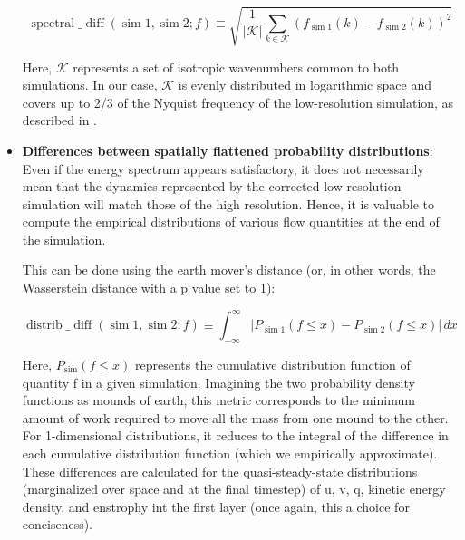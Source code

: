 \begin{itemize}
\begin{equation}
\operatorname{spectral}\_\operatorname{diff}(\operatorname{sim} 1, \operatorname{sim} 2 ; f) \equiv \sqrt{\frac{1}{|\mathcal{K}|} \sum_{k \in \mathcal{K}}\left(f_{\operatorname{sim} 1}(k)-f_{\operatorname{sim} 2}(k)\right)^2}
\end{equation}

Here, $\mathcal{K}$ represents a set of isotropic wavenumbers common to both simulations. In our case, $\mathcal{K}$ is evenly distributed in logarithmic space and covers up to 2/3 of the Nyquist frequency of the low-resolution simulation, as described in \cite{Benchmarking}.

\vspace{0.2em}
\item \textbf{Differences between spatially flattened probability distributions}: Even if the energy spectrum appears satisfactory, it does not necessarily mean that the dynamics represented by the corrected low-resolution simulation will match those of the high resolution. Hence, it is valuable to compute the empirical distributions of various flow quantities at the end of the simulation. 

\newpage

This can be done using the earth mover's distance (or, in other words, the Wasserstein distance with a p value set to 1):

\vspace{0.2em}
\begin{equation}
\operatorname{distrib}\_\operatorname{diff}(\operatorname{sim} 1, \operatorname{sim} 2 ; f)  \equiv \int_{-\infty}^{\infty}\left|P_{\operatorname{sim} 1}(f \leq x)-P_{\operatorname{sim} 2}(f \leq x)\right| \, dx
\label{C5 - EQ Distributions }
\end{equation}
\vspace{-0.1em}

Here, $P_{\operatorname{sim}}(f \leq x)$ represents the cumulative distribution function of quantity f in a given simulation. Imagining the two probability density functions as mounds of earth, this metric corresponds to the minimum amount of work required to move all the mass from one mound to the other. For 1-dimensional distributions, it reduces to the integral of the difference in each cumulative distribution function (which we empirically approximate). These differences are calculated for the quasi-steady-state distributions (marginalized over space and at the final timestep) of u, v, q, kinetic energy density, and enstrophy int the first layer (once again, this a choice for conciseness).


\end{itemize}
